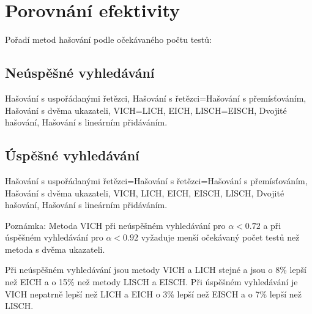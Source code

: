 \documentclass[a4paper,12pt]{article}
\begin{document}
\section{Porovnání efektivity}

Pořadí metod hašování podle očekávaného počtu 
testů:
\subsection{
Neúspěšné vyhledávání
}

\phantom{---}Hašování s uspořádanými řetězci,\newline 
\phantom{---}Hašování s řetězci=Hašování s přemísťováním,\newline 
\phantom{---}Hašování s dvěma ukazateli,\newline 
\phantom{---}VICH=LICH,\newline 
\phantom{---}EICH,\newline 
\phantom{---}LISCH=EISCH,\newline 
\phantom{---}Dvojité hašování,\newline 
\phantom{---}Hašování s lineárním přidáváním.

\subsection{
\'Uspěšné vyhledávání
}

\phantom{---}Hašování s uspořádanými řetězci=Hašování s 
řetězci=Hašo\-vá\-ní s přemísťováním,\newline 
\phantom{---}Hašování s dvěma ukazateli,\newline 
\phantom{---}VICH,\newline 
\phantom{---}LICH,\newline 
\phantom{---}EICH,\newline 
\phantom{---}EISCH,\newline 
\phantom{---}LISCH,\newline 
\phantom{---}Dvojité hašování,\newline 
\phantom{---}Hašování s lineárním přidáváním.

Poznámka: Metoda VICH při neúspěšném vyhledávání pro 
$\alpha <0.72$ a při úspěšném vy\-hledávání pro $
\alpha <0.92$ 
vyžaduje menší očekávaný počet testů než 
metoda s dvěma ukazateli.

Při neúspěšném vyhledávání jsou metody VICH a LICH stejné a jsou o 8\% lepší než 
EICH a o 15\% než metody LISCH a EISCH. Při úspěšném vyhledávání 
je VICH nepatrně lepší než LICH a EICH o 3\% lepší než 
EISCH a o 7\% lepší než LISCH.
\end{document}
